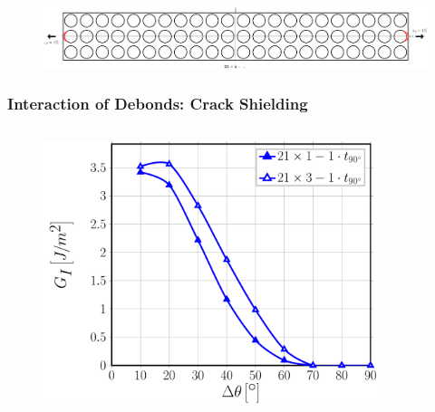 \documentclass[first,firstsupp,lastsupp,last,hyperref,table]{ETHclass}
\begin{document}
\begin{frame}
\begin{columns}[c]
\begin{column}{0.5\textwidth}
\begin{figure}
\end{figure}
\end{column}
\end{columns}
\vspace{-0.25cm}
\begin{figure}
\centering
\includegraphics[width=\textwidth]{twofibers-sameside-strainmagni21.pdf}
\end{figure}
\end{frame}

\begin{frame}
\frametitle{\vspace{0.2cm}\small Interaction of Debonds: Crack Shielding}
\vspace{-.75cm}
\centering
\begin{columns}[c]
\centering
\begin{column}{0.5\textwidth}
\centering
\begin{figure}
\centering
\includegraphics[width=\columnwidth]{nxk-1-vf60-GI-crackshield21.pdf}
\end{figure}
\end{column}
\begin{column}{0.5\textwidth}
\centering
\begin{figure}
\centering

\end{figure}
\end{column}
\end{columns}
\end{frame}
\end{document}
